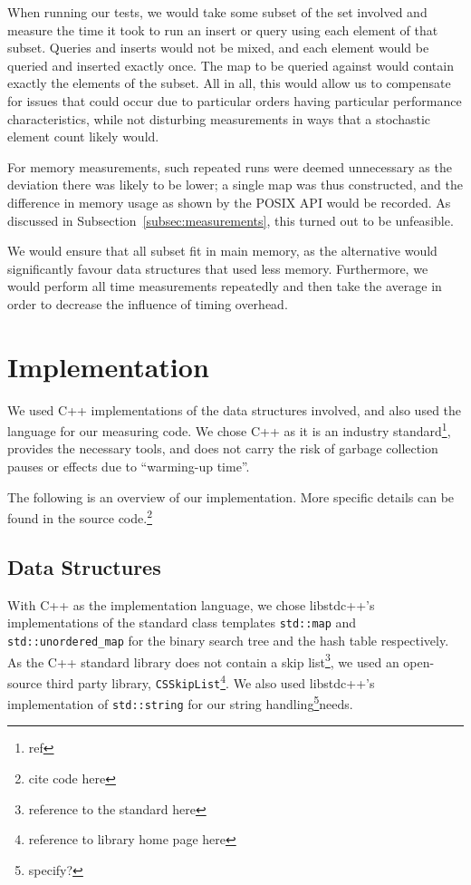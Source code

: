 \documentclass[12pt,a4paper]{article}
\begin{document}
    When running our tests, we would take some subset of the set involved and measure the time it
    took to run an insert or query using each element of that subset.  Queries and inserts would not
    be mixed, and each element would be queried and inserted exactly once.  The map to be queried
    against would contain exactly the elements of the subset.  All in all, this would allow us to
    compensate for issues that could occur due to particular orders having particular performance
    characteristics, while not disturbing measurements in ways that a stochastic element count
    likely would.

    For memory measurements, such repeated runs were deemed unnecessary as the deviation there was
    likely to be lower; a single map was thus constructed, and the difference in memory usage as
    shown by the POSIX API would be recorded.  As discussed in Subsection~\ref{subsec:measurements},
    this turned out to be unfeasible.

    We would ensure that all subset fit in main memory, as the alternative would significantly
    favour data structures that used less memory.  Furthermore, we would perform all time
    measurements repeatedly and then take the average in order to decrease the influence of timing
    overhead.


    \section{Implementation}
    \label{sec:implementation}

    We used C++ implementations of the data structures involved, and also used the language for our
    measuring code.  We chose C++ as it is an industry standard\footnote{ref}, provides the
    necessary tools, and does not carry the risk of garbage collection pauses or effects due to
    ``warming-up time''.

    The following is an overview of our implementation.  More specific details can be found in the
    source code.\footnote{cite code here}

    \subsection{Data Structures}

    With C++ as the implementation language, we chose libstdc++'s implementations of the standard
    class templates \texttt{std::map} and \texttt{std::unordered\_map} for the binary search tree
    and the hash table respectively.  As the C++ standard library does not contain a skip
    list\footnote{reference to the standard here}, we used an open-source third party library,
    \texttt{CSSkipList}\footnote{reference to library home page here}.  We also used libstdc++'s
    implementation of \texttt{std::string} for our string handling\footnote{specify?}needs.
\end{document}
